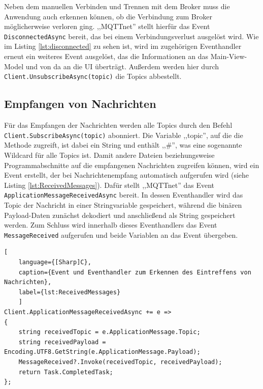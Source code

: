 Neben dem manuellen Verbinden und Trennen mit dem Broker muss die Anwendung auch erkennen können, ob die Verbindung zum Broker möglicherweise verloren ging. ,,MQTTnet'' stellt hierfür das Event \lstinline|DisconnectedAsync| bereit, das bei einem Verbindungsverlust ausgelöst wird. Wie im Listing \ref{lst:disconnected} zu sehen ist, 
wird im zugehörigen Eventhandler erneut ein weiteres Event ausgelöst, das die Informationen an das Main-View-Model und von da an die UI überträgt. Außerdem werden hier durch \lstinline|Client.UnsubscribeAsync(topic)| die Topics abbestellt.
\subsection{Empfangen von Nachrichten}
Für das Empfangen der Nachrichten werden alle Topics durch den Befehl \lstinline|Client.SubscribeAsync(topic)| abonniert. Die Variable ,,topic'', auf die die Methode zugreift, ist dabei ein String und enthält ,,\#'', was eine sogenannte Wildcard für alle Topics ist. 
Damit andere Dateien beziehungsweise Programmabschnitte auf die empfangenen Nachrichten zugreifen können, wird ein Event erstellt, der bei Nachrichtenempfang automatisch aufgerufen wird (siehe Listing \ref{lst:ReceivedMessages}). Dafür stellt ,,MQTTnet'' das Event \lstinline|ApplicationMessageReceivedAsync| bereit.  
In dessen Eventhandler wird das Topic der Nachricht in einer Stringvariable gespeichert, während die binären Payload-Daten zunächst dekodiert und anschließend als String gespeichert werden. Zum Schluss wird innerhalb dieses Eventhandlers das Event \lstinline|MessageReceived| aufgerufen und beide Variablen an das Event übergeben.
\begin{lstlisting}[
    language={[Sharp]C},
    caption={Event und Eventhandler zum Erkennen des Eintreffens von Nachrichten},
    label={lst:ReceivedMessages}
    ]
Client.ApplicationMessageReceivedAsync += e =>
{
    string receivedTopic = e.ApplicationMessage.Topic;
    string receivedPayload = Encoding.UTF8.GetString(e.ApplicationMessage.Payload);
    MessageReceived?.Invoke(receivedTopic, receivedPayload);
    return Task.CompletedTask;
};
\end{lstlisting}


